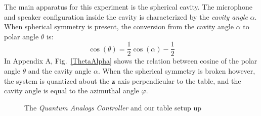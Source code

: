 \documentclass[12pt]{article}
\renewcommand{\vec}[1]{\mathbf{#1}} %
\newcommand{\figref}[1]{Fig.\ \ref{#1}}
\begin{document}
		The main apparatus for this experiment is the spherical cavity. The microphone and speaker configuration inside the cavity is characterized by the \emph{cavity angle} $\alpha$. When spherical symmetry is present, the conversion from the cavity angle $\alpha$ to polar angle $\theta$ is:
		\begin{equation}
		\label{alpha2theta}
		\cos(\theta) = \frac{1}{2}\cos(\alpha) - \frac{1}{2}
		\end{equation}
		In Appendix A, \figref{ThetaAlpha} shows the relation between cosine of the polar angle $\theta$ and the cavity angle $\alpha$. When the spherical symmetry is broken however, the system is quantized about the $\vec{z}$ axis perpendicular to the table, and the cavity angle is equal to the azimuthal angle $\varphi$.
		
%
%

		\begin{figure}[H]
			\captionsetup{justification = centering}
			\centering
			\qquad
			\caption{The \emph{Quantum Analogs Controller} \protect{} and our table setup up \protect{}}
			\label{experiment}
		\end{figure}
\end{document}
